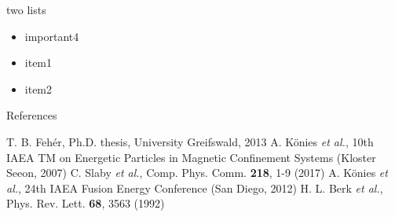 \documentclass[final]{beamer} %
\begin{document}
\begin{frame}
\begin{minipage}[t]{.49\textwidth}
\begin{kasten}{\large two lists}
\begin{itemize}
        \item important4
      \end{itemize}
      \begin{itemize}
        \item item1
        \item item2
      \end{itemize}
    \end{kasten}
    \begin{kasten}{\large References}
      \small
      \begin{thebibliography}{}
         T. B. Feh\'er, Ph.D. thesis, University   Greifswald, 2013
         A. K\"onies \textit{et al.}, 10th IAEA TM on Energetic Particles in Magnetic Confinement Systems (Kloster Seeon, 2007)
         C. Slaby \textit{et al.}, Comp. Phys. Comm. \textbf{218}, 1-9 (2017)
         A. K\"onies \textit{et al.}, 24th IAEA Fusion Energy Conference (San Diego, 2012)
         H. L. Berk \textit{et al.}, Phys. Rev. Lett. \textbf{68}, 3563 (1992)
      \end{thebibliography}
    \end{kasten}
  \vfill
  \end{minipage}
  \end{frame}
\end{document}

